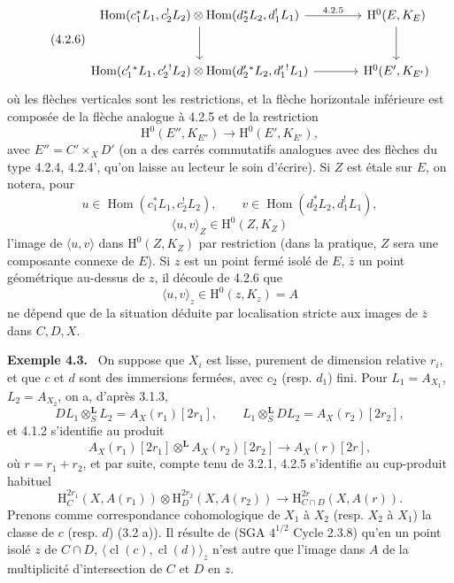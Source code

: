 \documentclass[11pt]{article}
\newenvironment{statement}[1]{\par\medskip\noindent\textbf{#1.}\ }{\par\medskip}
\renewcommand{\H}{\mathrm{H}}
\DeclareMathOperator{\Hom}{Hom}
\providecommand{\cl}{\operatorname{cl}}
\providecommand{\Hom}{\operatorname{Hom}}
\providecommand{\cl}{\operatorname{cl}}
\providecommand{\Hom}{\operatorname{Hom}}
\providecommand{\cl}{\operatorname{cl}}
\begin{document}
\begin{equation}
\tag{4.2.6}
\begin{tikzcd}[column sep=large,row sep=large]
\Hom(c_1^*L_1,c_2^!L_2)\otimes\Hom(d_2^*L_2,d_1^!L_1)
  \arrow[r,"4.2.5"] \arrow[d] &
\H^0(E,K_E)\arrow[d] \\
\Hom(c_1'{}^*L_1,c_2'{}^!L_2)\otimes\Hom(d_2'{}^*L_2,d_1'{}^!L_1)
  \arrow[r] &
\H^0(E',K_{E'})
\end{tikzcd}
\end{equation}
où les flèches verticales sont les restrictions, et la flèche horizontale inférieure est composée de la flèche analogue à 4.2.5 et de la restriction
\[
\H^0(E'',K_{E''})\longrightarrow \H^0(E',K_{E'}),
\]
avec $E''=C'\times_{X}D'$ (on a des carrés commutatifs analogues avec des flèches du type 4.2.4, 4.2.4', qu'on laisse au lecteur le soin d'écrire). Si $Z$ est étale sur $E$, on notera, pour
\[
u\in\Hom(c_1^*L_1,c_2^!L_2),\qquad
v\in\Hom(d_2^*L_2,d_1^!L_1),
\]
\begin{equation}
\tag{4.2.7}
\langle u,v\rangle_Z\in \H^0(Z,K_Z)
\end{equation}
l'image de $\langle u,v\rangle$ dans $\H^0(Z,K_Z)$ par restriction (dans la pratique, $Z$ sera une composante connexe de $E$). Si $z$ est un point fermé isolé de $E$, $\bar z$ un point géométrique au-dessus de $z$, il découle de 4.2.6 que
\[
\langle u,v\rangle_z\in \H^0(z,K_z)=A
\]
ne dépend que de la situation déduite par localisation stricte aux images de $\bar z$ dans $C,D,X$.

\begin{statement}{Exemple 4.3}
On suppose que $X_i$ est lisse, purement de dimension relative $r_i$, et que $c$ et $d$ sont des immersions fermées, avec $c_2$ (resp. $d_1$) fini. Pour $L_1=A_{X_1}$, $L_2=A_{X_2}$, on a, d'après 3.1.3,
\[
DL_1\otimes_S^{\mathbf L}L_2=A_X(r_1)[2r_1],\qquad
L_1\otimes_S^{\mathbf L}DL_2=A_X(r_2)[2r_2],
\]
et 4.1.2 s'identifie au produit
\[
A_X(r_1)[2r_1]\otimes^{\mathbf L}A_X(r_2)[2r_2]\longrightarrow A_X(r)[2r],
\]
où $r=r_1+r_2$, et par suite, compte tenu de 3.2.1, 4.2.5 s'identifie au cup-produit habituel
\[
\H_C^{2r_1}(X,A(r_1))\otimes \H_D^{2r_2}(X,A(r_2))
\longrightarrow
\H_{C\cap D}^{2r}(X,A(r)).
\]
Prenons comme correspondance cohomologique de $X_1$ à $X_2$ (resp. $X_2$ à $X_1$) la classe de $c$ (resp. $d$) (3.2 a)). Il résulte de (SGA $4^{1/2}$ Cycle 2.3.8) qu'en un point isolé $z$ de $C\cap D$, $\langle \cl(c),\cl(d)\rangle_z$ n'est autre que l'image dans $A$ de la multiplicité d'intersection de $C$ et $D$ en $z$.
\end{statement}
\end{document}
